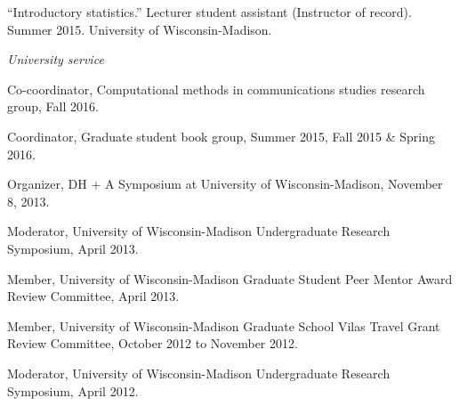\documentclass[11pt,article,oneside]{memoir}
\begin{document}
\ind ``Introductory statistics.'' Lecturer student assistant (Instructor of record). Summer 2015. University of Wisconsin-Madison.




\bigskip

\medskip

\noindent\emph{University service \vspace{0.05in}}

\ind Co-coordinator, Computational methods in communications studies research group, Fall 2016.

\ind Coordinator, Graduate student book group, Summer 2015, Fall 2015 \& Spring 2016.

\ind Organizer, DH + A Symposium at University of Wisconsin-Madison, November 8, 2013. 

\ind Moderator, University of Wisconsin-Madison Undergraduate Research Symposium, April 2013.

\ind Member, University of Wisconsin-Madison Graduate Student Peer Mentor Award Review Committee,
April 2013.

\ind Member, University of Wisconsin-Madison Graduate School Vilas Travel Grant Review Committee,
October 2012 to November 2012.

\ind Moderator, University of Wisconsin-Madison Undergraduate Research Symposium, April 2012.
\end{document}
